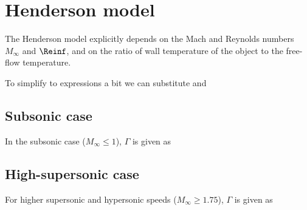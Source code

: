 \section{Henderson model} \label{DH}
    The Henderson model \cite{henderson} explicitly depends on the Mach
    and Reynolds numbers $M_\infty$ and $\Reinf$,
    and on the ratio of wall temperature of the object to the free-flow temperature.

    To simplify to expressions a bit we can substitute
    and

    \subsection{Subsonic case}
        In the subsonic case ($M_\infty \leq 1$), $\Gamma$ is given as

    \subsection{High-supersonic case} \label{DH-h}
        For higher supersonic and hypersonic speeds ($M_\infty \geq \num{1.75}$), $\Gamma$ is given as

